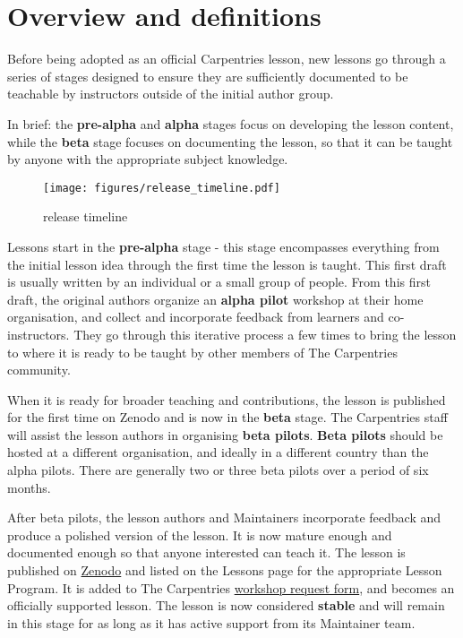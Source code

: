 \documentclass[
]{book}
\begin{document}
\hypertarget{overview-and-definitions}{%
\section{Overview and definitions}\label{overview-and-definitions}}

Before being adopted as an official Carpentries lesson,
new lessons go through a series of stages designed to
ensure they are sufficiently documented to be teachable
by instructors outside of the initial author group.

In brief: the \textbf{pre-alpha} and \textbf{alpha} stages focus on
developing the lesson content, while the \textbf{beta} stage
focuses on documenting the lesson, so that it can be
taught by anyone with the appropriate subject knowledge.

\begin{figure}
\centering
\texttt{[image: figures/release\_timeline.pdf]}
\caption{\label{fig:release-timeline}release timeline}
\end{figure}

Lessons start in the \textbf{pre-alpha} stage - this stage
encompasses everything from the initial lesson idea
through the first time the lesson is taught. This
first draft is usually written by an individual
or a small group of people. From this first draft, the
original authors organize an \textbf{alpha pilot} workshop at
their home organisation, and collect and incorporate
feedback from learners and co-instructors. They go
through this iterative process a few times to bring the
lesson to where it is ready to be taught by other
members of The Carpentries community.

When it is ready for broader teaching and contributions,
the lesson is published for
the first time on Zenodo and is now in the \textbf{beta}
stage. The Carpentries staff will assist the lesson
authors in organising \textbf{beta pilots}.
\textbf{Beta pilots}
should be hosted at a different organisation, and
ideally in a different country than the alpha pilots.
There are generally two or three beta pilots over a
period of six months.

After beta pilots, the lesson authors and Maintainers
incorporate feedback and produce a polished version of
the lesson. It is now mature enough and
documented enough so that anyone interested can teach it. The lesson is published on \href{https://zenodo.org/communities/carpentries/?page=1\&size=20}{Zenodo} and listed on the
Lessons page for the appropriate
Lesson Program. It is added to The Carpentries
\href{http://carpentries.org/request-workshop}{workshop request form}, and becomes an officially
supported lesson. The lesson is now considered \textbf{stable} and will remain in this stage for as long
as it has active support from its Maintainer team.
\end{document}
